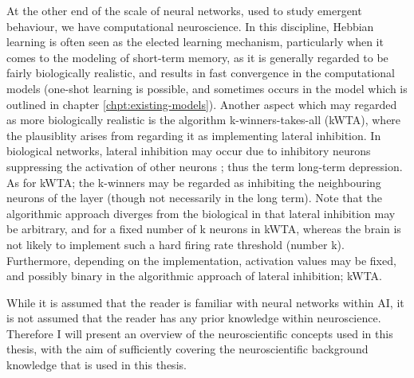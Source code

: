 At the other end of the scale of neural networks, used to study emergent behaviour, we have computational neuroscience. In this discipline, Hebbian learning is often seen as the elected learning mechanism, particularly when it comes to the modeling of short-term memory, as it is generally regarded to be fairly biologically realistic, and results in fast convergence in the computational models (one-shot learning is possible, and sometimes occurs in the model which is outlined in chapter \ref{chpt:existing-models}). 
Another aspect which may regarded as more biologically realistic is the algorithm k-winners-takes-all (kWTA), where the plausiblity arises from regarding it as implementing lateral inhibition. In biological networks, lateral inhibition may occur due to inhibitory neurons suppressing the activation of other neurons \citep{Rolls1998chpt1}; thus the term long-term depression. As for kWTA; the k-winners may be regarded as inhibiting the neighbouring neurons of the layer (though not necessarily in the long term). Note that the algorithmic approach diverges from the biological in that lateral inhibition may be arbitrary, and for a fixed number of k neurons in kWTA, whereas the brain is not likely to implement such a hard firing rate threshold (number k). Furthermore, depending on the implementation, activation values may be fixed, and possibly binary in the algorithmic approach of lateral inhibition; kWTA.

While it is assumed that the reader is familiar with neural networks within AI, it is not assumed that the reader has any prior knowledge within neuroscience. Therefore I will present an overview of the neuroscientific concepts used in this thesis, with the aim of sufficiently covering the neuroscientific background knowledge that is used in this thesis.
\\

